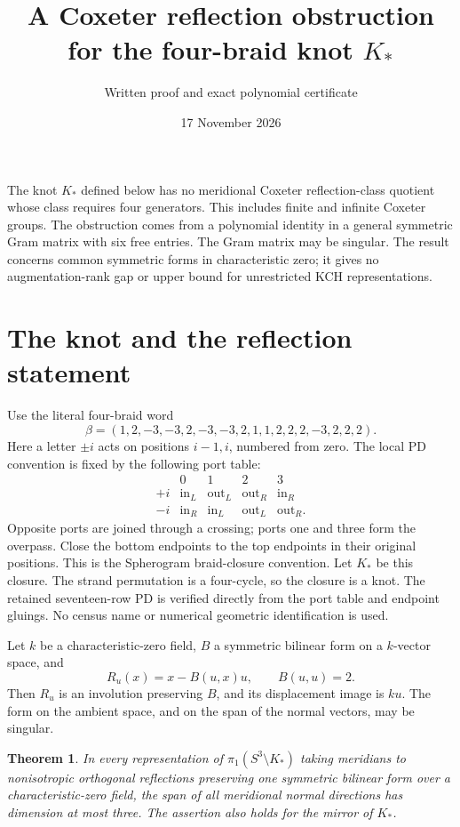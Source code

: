 \documentclass[11pt]{article}
\title{A Coxeter reflection obstruction for the four-braid knot $K_*$}
\author{Written proof and exact polynomial certificate}
\date{17 November 2026}
\newtheorem{theorem}{Theorem}
\begin{document}
\maketitle

The knot $K_*$ defined below has no meridional Coxeter reflection-class
quotient whose class requires four generators. This includes finite
and infinite Coxeter groups. The obstruction comes from a polynomial
identity in a general symmetric Gram matrix with six free entries.
The Gram matrix may be singular. The result concerns common symmetric
forms in characteristic zero; it gives no augmentation-rank gap or
upper bound for unrestricted KCH representations.

\section{The knot and the reflection statement}
Use the literal four-braid word
\begin{equation}\label{eq:beta}
 \beta=(1,2,-3,-3,2,-3,-3,2,1,1,2,2,2,-3,2,2,2).
\end{equation}
Here a letter $\pm i$ acts on positions $i-1,i$, numbered from zero.
The local PD convention is fixed by the following port table:
\[
\begin{array}{c|cccc}
 &0&1&2&3\\\hline
 +i&\mathrm{in}_L&\mathrm{out}_L&\mathrm{out}_R&\mathrm{in}_R\\
 -i&\mathrm{in}_R&\mathrm{in}_L&\mathrm{out}_L&\mathrm{out}_R .
\end{array}
\]
Opposite ports are joined through a crossing; ports one and three
form the overpass. Close the bottom endpoints to the top endpoints
in their original positions. This is the Spherogram braid-closure
convention. Let $K_*$ be this closure. The strand permutation is a
four-cycle, so the closure is a knot. The retained seventeen-row PD
is verified directly from the port table and endpoint gluings.
No census name or numerical geometric identification is used.

Let $k$ be a characteristic-zero field, $B$ a symmetric bilinear form
on a $k$-vector space, and
\[
             R_u(x)=x-B(u,x)u,\qquad B(u,u)=2 .
\]
Then $R_u$ is an involution preserving $B$, and its displacement image
is $ku$. The form on the ambient space, and on the span of the
normal vectors, may be singular.

\begin{theorem}\label{thm:reflection}
In every representation of $\pi_1(S^3\setminus K_*)$ taking meridians
to nonisotropic orthogonal reflections preserving one symmetric
bilinear form over a characteristic-zero field, the span of all
meridional normal directions has dimension at most three.
The assertion also holds for the mirror of $K_*$.
\end{theorem}
\end{document}
